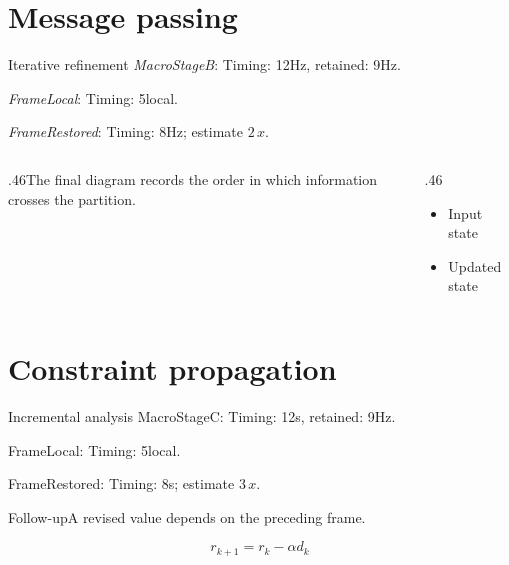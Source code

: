 \documentclass[11pt,aspectratio=169]{beamer}
\newcommand{\fuzzlayerA}[1]{\textit{#1}}
\newcommand{\fuzzlayerB}[1]{\fuzzlayerA{#1}}
\newcommand{\fuzzterm}[1]{\fuzzlayerB{#1}}
\newcommand{\fuzzpair}[2]{\fuzzterm{#1}: #2}
\newcommand{\fuzzunit}{Hz}
\let\fuzzoriginalunit\fuzzunit
\newcommand{\fuzzcoefficient}{2}
\newcommand{\fuzzscale}[2][\fuzzcoefficient]{#1\,#2}
\begin{document}
\section{Message passing}
\begin{frame}[t]{Iterative refinement}
\fuzzpair{MacroStageB}{Timing: 12\fuzzunit, retained: 9\fuzzoriginalunit.}\par
{\renewcommand{\fuzzunit}{local}\fuzzpair{FrameLocal}{Timing: 5\fuzzunit.}\par}
\fuzzpair{FrameRestored}{Timing: 8\fuzzunit; estimate $\fuzzscale{x}$.}\par
\begin{columns}[T]\begin{column}{.46\textwidth}The final diagram records the order in which information crosses the partition.\end{column}\begin{column}{.46\textwidth}\begin{itemize}\item Input state\item Updated state\end{itemize}\end{column}\end{columns}
\end{frame}
\renewcommand{\fuzzunit}{s}
\renewcommand{\fuzzcoefficient}{3}
\renewcommand{\fuzzterm}[1]{{\textrm{#1}}}
\section{Constraint propagation}
\begin{frame}[t]{Incremental analysis}
\fuzzpair{MacroStageC}{Timing: 12\fuzzunit, retained: 9\fuzzoriginalunit.}\par
{\renewcommand{\fuzzunit}{local}\fuzzpair{FrameLocal}{Timing: 5\fuzzunit.}\par}
\fuzzpair{FrameRestored}{Timing: 8\fuzzunit; estimate $\fuzzscale{x}$.}\par
\begin{block}{Follow-up}\fuzzterm{A revised value} depends on the preceding frame.\end{block}
\[r_{k+1}=r_k-\alpha d_k\]
\end{frame}
\renewcommand{\fuzzunit}{us}
\renewcommand{\fuzzcoefficient}{4}
\renewcommand{\fuzzterm}[1]{{\textit{#1}}}
\end{document}
